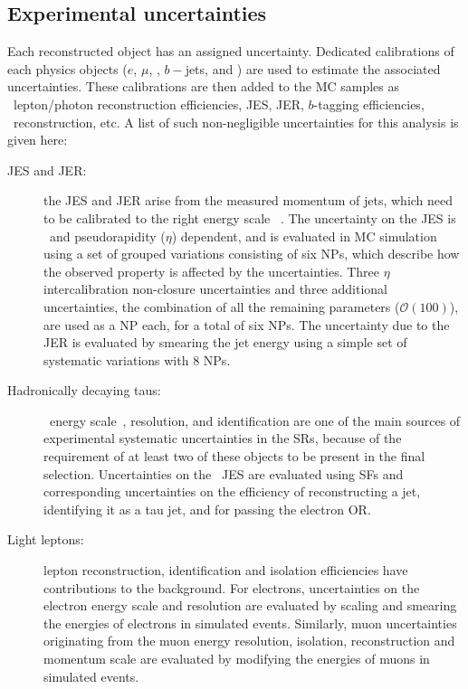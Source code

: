 	\subsection{Experimental uncertainties}
	Each reconstructed object has an assigned uncertainty. Dedicated calibrations of each physics objects ($e$, $\mu$, \htau, $b-$jets, and \met) are used to estimate the associated uncertainties. These calibrations are then added to the \ac{MC} samples as \eg\ lepton/photon reconstruction efficiencies, \ac{JES}, \ac{JER}, $b$-tagging efficiencies, \met\ reconstruction, etc. 
	A list of such non-negligible uncertainties for this analysis is given here:
	\begin{description}
	\item[\ac{JES} and \ac{JER}:] the \ac{JES} and \ac{JER} arise from the measured momentum of jets, which need to be calibrated to the right energy scale ~\cite{ATLAS13TeVJES}. 
	The uncertainty on the \ac{JES} is \pt\ and pseudorapidity ($\eta$) dependent, and is evaluated in \ac{MC} simulation using a set of grouped variations consisting of six \acp{NP}, which describe how the observed property is affected by the uncertainties.  
	 Three $\eta$ intercalibration non-closure uncertainties and three additional uncertainties, the combination of all the remaining parameters ($\mathcal{O}(100)$), are used as a \ac{NP} each, for a total of six \acp{NP}.
	The uncertainty due to the \ac{JER} is evaluated by smearing the jet energy using a simple set of systematic variations with 8 \acp{NP}.
	\item[Hadronically decaying taus:] \ltau\ energy scale~\cite{Mitani:2199788}, resolution, and identification are one of the main sources of experimental systematic uncertainties in the \acp{SR}, because of the requirement of at least two of these objects to be present in the final selection. 
	 Uncertainties on the \ltau\ \ac{JES} are evaluated using \acp{SF} and corresponding uncertainties on the efficiency of reconstructing a jet, identifying it as a tau jet, and for passing the electron \ac{OR}.
	\item[Light leptons:] lepton reconstruction, identification and isolation efficiencies have contributions to the background. For electrons, uncertainties on the electron energy scale and resolution are evaluated by scaling and smearing the energies of electrons in simulated events. Similarly, muon uncertainties originating from the muon energy resolution, isolation, reconstruction and momentum scale are evaluated by modifying the energies of muons in simulated events. 		

\end{description}
